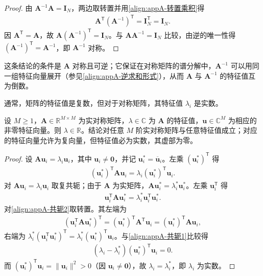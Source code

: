 \documentclass[../main.tex]{subfiles}
\begin{document}
\begin{proof}
由 $\bm{A}^{-1}\bm{A}=\bm{I}_{N}$，两边取转置并用\eqref{align:appA-转置乘积}得
\begin{align*}
 \bm{A}^{\mathsf{T}}(\bm{A}^{-1})^{\mathsf{T}}=\bm{I}_{N}^{\mathsf{T}}=\bm{I}_{N}.
\end{align*}
因 $\bm{A}^{\mathsf{T}}=\bm{A}$，故 $\bm{A}(\bm{A}^{-1})^{\mathsf{T}}=\bm{I}_{N}$。与 $\bm{A}\bm{A}^{-1}=\bm{I}_{N}$ 比较，由逆的唯一性得 $(\bm{A}^{-1})^{\mathsf{T}}=\bm{A}^{-1}$，即 $\bm{A}^{-1}$ 对称。
\end{proof}

\begin{remark}
这条结论的条件是 $\bm{A}$ 对称且可逆；它保证在对称矩阵的谱分解中，$\bm{A}^{-1}$ 可以用同一组特征向量展开（参见\eqref{align:appA-逆求和形式}），从而 $\bm{A}$ 与 $\bm{A}^{-1}$ 的特征值互为倒数。
\end{remark}

通常，矩阵的特征值是复数，但对于对称矩阵，其特征值 $\lambda_i$ 是实数。

\begin{proposition}[实对称矩阵的特征值为实数]\label{proposition:appA-实对称特征值为实}
设 $M\geqslant1$，$\bm{A}\in\mathbb{R}^{M\times M}$ 为实对称矩阵，$\lambda\in\mathbb{C}$ 为 $\bm{A}$ 的特征值，$\bm{u}\in\mathbb{C}^{M}$ 为相应的非零特征向量。则 $\lambda\in\mathbb{R}$。结论对任意 $M$ 阶实对称矩阵与任意特征值成立；对应的特征向量允许为复向量，但特征值必为实数，其虚部为零。
\end{proposition}

\begin{proof}
设 $\bm{A}\bm{u}_i=\lambda_i\bm{u}_i$，其中 $\bm{u}_i\neq\bm{0}$，并记 $\bm{u}_i^{*}=\overline{\bm{u}}_i$。左乘 $(\bm{u}_i^{*})^{\mathsf{T}}$ 得
\begin{align}
 (\bm{u}_i^{*})^{\mathsf{T}}\bm{A}\bm{u}_i=\lambda_i(\bm{u}_i^{*})^{\mathsf{T}}\bm{u}_i.
 \label{align:appA-共轭1}
\end{align}
对 $\bm{A}\bm{u}_i=\lambda_i\bm{u}_i$ 取复共轭；由于 $\bm{A}$ 为实矩阵，$\bm{A}\bm{u}_i^{*}=\lambda_i^{*}\bm{u}_i^{*}$。左乘 $\bm{u}_i^{\mathsf{T}}$ 得
\begin{align}
 \bm{u}_i^{\mathsf{T}}\bm{A}\bm{u}_i^{*}=\lambda_i^{*}\bm{u}_i^{\mathsf{T}}\bm{u}_i^{*}.
 \label{align:appA-共轭2}
\end{align}
对\eqref{align:appA-共轭2}取转置。其左端为
\begin{align*}
 (\bm{u}_i^{\mathsf{T}}\bm{A}\bm{u}_i^{*})^{\mathsf{T}}=(\bm{u}_i^{*})^{\mathsf{T}}\bm{A}^{\mathsf{T}}\bm{u}_i=(\bm{u}_i^{*})^{\mathsf{T}}\bm{A}\bm{u}_i,
\end{align*}
右端为 $\lambda_i^{*}(\bm{u}_i^{\mathsf{T}}\bm{u}_i^{*})^{\mathsf{T}}=\lambda_i^{*}(\bm{u}_i^{*})^{\mathsf{T}}\bm{u}_i$。与\eqref{align:appA-共轭1}比较得
\begin{align*}
 (\lambda_i-\lambda_i^{*})(\bm{u}_i^{*})^{\mathsf{T}}\bm{u}_i=0.
\end{align*}
而 $(\bm{u}_i^{*})^{\mathsf{T}}\bm{u}_i=\|\bm{u}_i\|^{2}>0$（因 $\bm{u}_i\neq\bm{0}$），故 $\lambda_i=\lambda_i^{*}$，即 $\lambda_i$ 为实数。
\end{proof}
\end{document}
